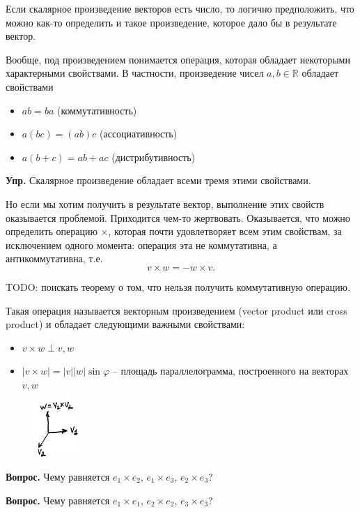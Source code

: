 \documentclass[a4paper,12pt]{article}
\newcommand{\ph}{\varphi}
\newcommand{\R}{\mathbb{R}}
\newcounter{z-counter}
\newcounter{th-counter}
\begin{document}
Если скалярное произведение векторов есть число, то логично предположить, что можно как-то определить и такое произведение, которое дало бы в результате вектор.

Вообще, под произведением понимается операция, которая обладает некоторыми характерными свойствами. В частности, произведение чисел $a,b \in \R$ обладает свойствами
\begin{itemize}
    \item $ab = ba$ (коммутативность)
    \item $a(bc) = (ab)c$ (ассоциативность)
    \item $a(b+c) = ab + ac$ (дистрибутивность)
\end{itemize}
\noindent\textbf{Упр.} Скалярное произведение обладает всеми тремя этими свойствами.

Но если мы хотим получить в результате вектор, выполнение этих свойств оказывается проблемой. Приходится чем-то жертвовать. Оказывается, что можно определить операцию $\times$, которая почти удовлетворяет всем этим свойствам, за исключением одного момента: операция эта не коммутативна, а антикоммутативна, т.е.
\[
v \times w = -w \times v.
\]

TODO: поискать теорему о том, что нельзя получить коммутативную операцию.

Такая операция называется векторным произведением (vector product или cross product) и обладает следующими важными свойствами:
\begin{itemize}
    \item $v \times w \perp v, w$
    \item $|v \times w| = |v||w|\sin \ph$ -- площадь параллелограмма, построенного на векторах $v,w$ 
\end{itemize}

\begin{figure}[H] %
    \centering
    \includegraphics[width=0.15\textwidth]{pictures/pct_cross_product.jpg}
\end{figure}

\noindent\textbf{Вопрос.} Чему равняется $e_1 \times e_2$, $e_1 \times e_3$, $e_2 \times e_3$?

\noindent\textbf{Вопрос.} Чему равняется $e_1 \times e_1$, $e_2 \times e_2$, $e_3 \times e_3$?
\end{document}
